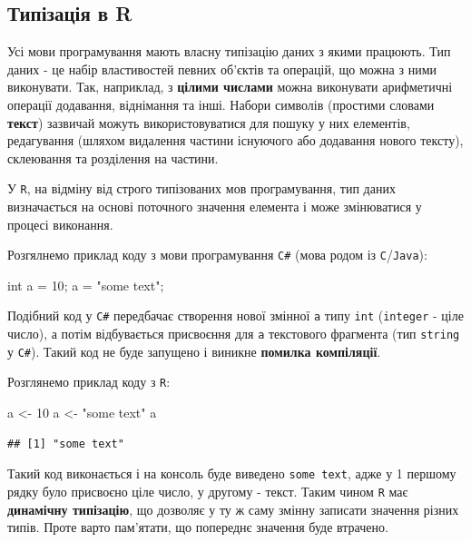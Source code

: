 \documentclass[
]{book}
\newenvironment{Shaded}{\begin{snugshade}}{\end{snugshade}}
\newcommand{\DataTypeTok}[1]{\textcolor[rgb]{0.13,0.29,0.53}{#1}}
\newcommand{\DecValTok}[1]{\textcolor[rgb]{0.00,0.00,0.81}{#1}}
\newcommand{\NormalTok}[1]{#1}
\newcommand{\OtherTok}[1]{\textcolor[rgb]{0.56,0.35,0.01}{#1}}
\newcommand{\StringTok}[1]{\textcolor[rgb]{0.31,0.60,0.02}{#1}}
\begin{document}
\hypertarget{chapter221}{%
\subsection{Типізація в R}\label{chapter221}}

Усі мови програмування мають власну типізацію даних з якими працюють. Тип даних - це набір властивостей певних об'єктів та операцій, що можна з ними виконувати. Так, наприклад, з \textbf{цілими числами} можна виконувати арифметичні операції додавання, віднімання та інші. Набори символів (простими словами \textbf{текст}) зазвичай можуть використовуватися для пошуку у них елементів, редагування (шляхом видалення частини існуючого або додавання нового тексту), склеювання та розділення на частини.

У \texttt{R}, на відміну від строго типізованих мов програмування, тип даних визначається на основі поточного значення елемента і може змінюватися у процесі виконання.

Розгялнемо приклад коду з мови програмування \texttt{C\#} (мова родом із \texttt{C}/\texttt{Java}):

\begin{Shaded}
\begin{Highlighting}[]
\DataTypeTok{int}\NormalTok{ a = }\DecValTok{10}\NormalTok{;}
\NormalTok{a = }\StringTok{"some text"}\NormalTok{;}
\end{Highlighting}
\end{Shaded}

Подібний код у \texttt{C\#} передбачає створення нової змінної \texttt{a} типу \texttt{int} (\texttt{integer} - ціле число), а потім відбувається присвоєння для \texttt{a} текстового фрагмента (тип \texttt{string} у \texttt{С\#}). Такий код не буде запущено і виникне {\textbf{помилка компіляції}}.

Розглянемо приклад коду з \texttt{R}:

\begin{Shaded}
\begin{Highlighting}[]
\NormalTok{a }\OtherTok{\textless{}{-}} \DecValTok{10}
\NormalTok{a }\OtherTok{\textless{}{-}} \StringTok{"some text"}
\NormalTok{a}
\end{Highlighting}
\end{Shaded}

\begin{verbatim}
## [1] "some text"
\end{verbatim}

Такий код виконається і на консоль буде виведено \texttt{some\ text}, адже у 1 першому рядку було присвоєно ціле число, у другому - текст. Таким чином \texttt{R} має \textbf{динамічну типізацію}, що дозволяє у ту ж саму змінну записати значення різних типів. Проте варто пам'ятати, що попереднє значення буде втрачено.
\end{document}
